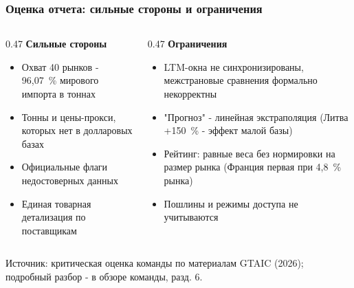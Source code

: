 \documentclass{beamer}
\begin{document}
\begin{frame}[t]
  \frametitle{Оценка отчета: сильные стороны и ограничения}
  {\footnotesize
  \begin{columns}[t]
    \begin{column}{0.47\textwidth}
      \textbf{Сильные стороны}
      \begin{itemize}
        \item Охват 40 рынков - 96,07~\% мирового импорта в тоннах
        \item Тонны и цены-прокси, которых нет в долларовых базах
        \item Официальные флаги недостоверных данных
        \item Единая товарная детализация по поставщикам
      \end{itemize}
    \end{column}
    \begin{column}{0.47\textwidth}
      \textbf{Ограничения}
      \begin{itemize}
        \item LTM-окна не синхронизированы, межстрановые сравнения формально некорректны
        \item "Прогноз" - линейная экстраполяция (Литва +150~\% - эффект малой базы)
        \item Рейтинг: равные веса без нормировки на размер рынка (Франция первая при 4,8~\% рынка)
        \item Пошлины и режимы доступа не учитываются
      \end{itemize}
    \end{column}
  \end{columns}}
  \vfill
  {\scriptsize\color{srcgray} Источник: критическая оценка команды по материалам GTAIC (2026); подробный разбор - в обзоре команды, разд. 6.\par}
\end{frame}
\end{document}
